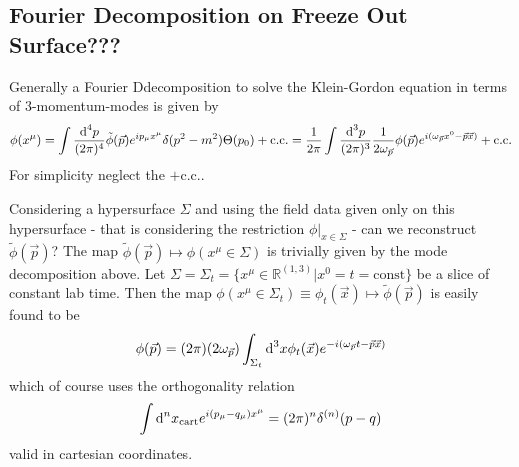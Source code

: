 \subsection{Fourier Decomposition on Freeze Out Surface???}

Generally a Fourier Ddecomposition to solve the Klein-Gordon equation in terms of $3$-momentum-modes is given by
\begin{equation}
    \phi(x^\mu)=\int\frac{\text{d}^4p}{(2\pi)^4}\tilde{\phi}(\vec{p})e^{{i} p_\mu x^\mu}\delta(p^2-m^2)\Theta(p_0)+\text{c.c.}=\frac{1}{2\pi}\int\frac{\text{d}^3p}{(2\pi)^3}\frac{1}{2\omega_{\vec{p}}}\phi(\vec{p})e^{{i}(\omega_{\vec{p}}x^0-\vec{p}\vec{x})}+\text{c.c.}
\end{equation}
For simplicity neglect the $+\text{c.c.}$.

Considering a hypersurface $\Sigma$ and using the field data given only on this hypersurface - that is considering the restriction $\phi\vert_{x\in\Sigma}$ - can we reconstruct $\tilde{\phi}(\vec{p})$? The map $\tilde{\phi}(\vec{p})\mapsto\phi(x^\mu\in\Sigma)$ is trivially given by the mode decomposition above. Let $\Sigma=\Sigma_t=\{x^\mu\in\mathbb{R}^{(1,3)}\vert x^0=t=\text{const}\}$ be a slice of constant lab time. Then the map $\phi(x^\mu\in\Sigma_t)\equiv \phi_t(\vec{x})\mapsto\tilde{\phi}(\vec{p})$ is easily found to be
\begin{equation}
    \phi(\vec{p})=(2\pi)(2\omega_{\vec{p}})\int_{\Sigma_t}\text{d}^3x\phi_t(\vec{x})e^{-{i}(\omega_{\vec{p}}t-\vec{p}\vec{x})}
\end{equation}
which of course uses the orthogonality relation
\begin{equation}
    \int\text{d}^nx_{\text{cart}}e^{{i} (p_\mu-q_\mu)x^\mu}=(2\pi)^n\delta^{(n)}(p-q)
\end{equation}
valid in cartesian coordinates.

